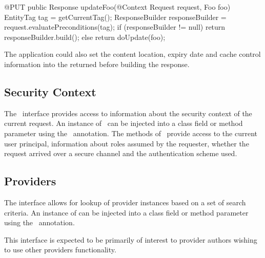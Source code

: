 \begin{listing}{1}
@PUT
public Response updateFoo(@Context Request request, Foo foo) {
	EntityTag tag = getCurrentTag();
	ResponseBuilder responseBuilder = request.evaluatePreconditions(tag);
	if (responseBuilder != null)
	  return responseBuilder.build();
	else
	  return doUpdate(foo);
}
\end{listing}


The application could also set the content location, expiry date and cache control information into the returned  before building the response.

\subsection{Security Context}
\label{security_context}

The \SecurityContext\ interface provides access to information about the security context of the current request. An instance of \SecurityContext\ can be injected into a class field or method parameter using the \Context\ annotation. The methods of \SecurityContext\ provide access to the current user principal, information about roles assumed by the requester, whether the request arrived over a secure channel and the authentication scheme used.

\subsection{Providers}
\label{providercontext}

The  interface allows for lookup of provider instances based on a set of search criteria. An instance of  can be injected into a class field or method parameter using the \Context\ annotation.

This interface is expected to be primarily of interest to provider authors wishing to use other providers functionality.
